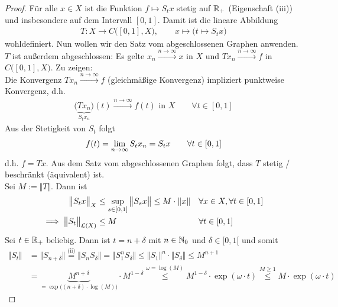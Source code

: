 \begin{proof}
	Für alle $x\in X$ ist die Funktion $f\mapsto S_t x$ stetig auf $\mathbb{R}_+$ (Eigenschaft (iii)) und insbesondere auf dem Intervall $[0,1]$. 
	Damit ist die lineare Abbildung 
	\begin{align*}
		T:X\to C\big([0,1],X\big),\qquad x\mapsto\big(t\mapsto S_t x\big)
	\end{align*}
	wohldefiniert. 
	Nun wollen wir den Satz vom abgeschlossenen Graphen anwenden. 
	$T$ ist außerdem abgeschlossen: 
	Es gelte $x_n\stackrel{n\to\infty}{\longrightarrow}x$ in $X$ und $T x_n\stackrel{n\to\infty}{\longrightarrow}f$ in $C\big([0,1],X\big)$. 
	Zu zeigen:\\
	Die Konvergenz $T x_n\stackrel{n\to\infty}{\longrightarrow}f$ (gleichmäßige Konvergenz) impliziert punktweise Konvergenz, d.h.
	\begin{align*}
		\big(\underbrace{T x_n}_{S_t x_n}\big)(t)\stackrel{n\to\infty}{\longrightarrow} f(t)\text{ in }X\qquad\forall t\in[0,1]
	\end{align*}
	Aus der Stetigkeit von $S_t$ folgt
	\begin{align*}
		f(t)=\lim\limits_{n\to\infty} S_t x_n=S_t x\qquad\forall t\in[0,1]
	\end{align*}
	d.h. $f=T x$. 
	Aus dem Satz vom abgeschlossenen Graphen folgt, dass $T$ stetig / beschränkt (äquivalent) ist.\\
	Sei $M:=\Vert T\Vert$. Dann ist 
	\begin{align*}
		\big\Vert S_t x\big\Vert_X&\leq\sup\limits_{s\in[0,1]}\big\Vert S_s x\big\Vert\leq M\cdot\Vert x\Vert&\forall& x\in X,\forall t\in[0,1]\\
		\implies\big\Vert S_t\big\Vert_{\mathcal{L}(X)}&\leq M &\forall& t\in [0,1]
	\end{align*}
	Sei $t\in\mathbb{R}_+$ beliebig. 
	Dann ist $t=n+\delta$ mit $n\in\mathbb{N}_0$ und $\delta\in[0,1[$ und somit
	\begin{align*}
		\big\Vert S_t\big\Vert
		&=\big\Vert S_{n+\delta}\big\Vert
		\overset{\text{(ii)}}{=}
		\big\Vert S_n S_\delta\big\Vert
		=\big\Vert S_1^n S_\delta\big\Vert
		\leq\big\Vert S_1\big\Vert^n\cdot\big\Vert S_\delta\big\Vert
		\leq M^{n+1}\\
		&=\underbrace{M^{n+\delta}}_{=\exp\big((n+\delta)\cdot\log(M)\big)}\cdot M^{1-\delta}
		\overset{\omega=\log(M)}\leq
		M^{1-\delta}\cdot\exp(\omega\cdot t)
		\overset{M\geq1}{\leq}
		M\cdot\exp(\omega\cdot t)
	\end{align*}
\end{proof}


